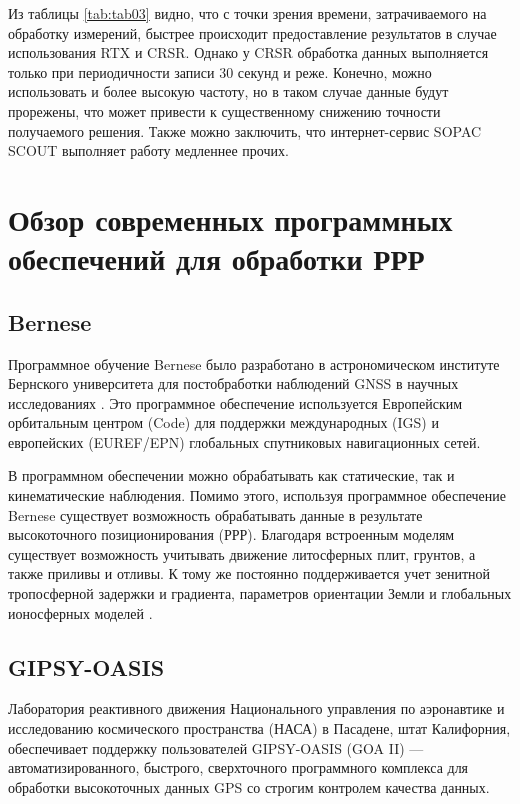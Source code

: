 Из таблицы \cref{tab:tab03} видно, что с точки зрения времени, затрачиваемого на обработку измерений, быстрее происходит предоставление результатов в случае использования RTX и CRSR. Однако у CRSR обработка данных выполняется только при периодичности записи 30 секунд и реже. Конечно, можно использовать и более высокую частоту, но в таком случае данные будут прорежены, что может привести к существенному снижению точности получаемого решения. Также можно заключить, что интернет-сервис SOPAC SCOUT выполняет работу медленнее прочих.



\section{Обзор современных программных обеспечений для обработки РРР}\label{sec:ch2/sec2}

\subsection{Bernese} \label{subsec:ch2/sec2/sub1}

Программное обучение Bernese было разработано в астрономическом институте Бернского университета для постобработки наблюдений GNSS в научных исследованиях \cite{src47}. Это программное обеспечение используется Европейским орбитальным центром (Code) для поддержки международных (IGS) и европейских (EUREF/EPN) глобальных спутниковых навигационных сетей. 

В программном обеспечении можно обрабатывать как статические, так и кинематические наблюдения. Помимо этого, используя программное обеспечение Bernese существует возможность обрабатывать данные в результате высокоточного позиционирования (РРР). Благодаря встроенным моделям существует возможность учитывать движение литосферных плит, грунтов, а также приливы и отливы. К тому же постоянно поддерживается учет зенитной тропосферной задержки и градиента, параметров ориентации Земли и глобальных ионосферных моделей \cite{src51,src52}.

\subsection{GIPSY-OASIS} \label{subsec:ch2/sec2/sub2}

Лаборатория реактивного движения Национального управления по аэронавтике и исследованию космического пространства (НАСА) в Пасадене, штат Калифорния, обеспечивает поддержку пользователей GIPSY-OASIS (GOA II) --- автоматизированного, быстрого, сверхточного программного комплекса для обработки высокоточных данных GPS со строгим контролем качества данных.

